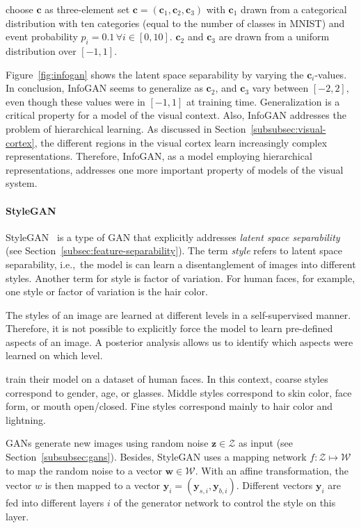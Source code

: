  \citet{chen2016infogan} choose $\bm{c}$ as three-element set $\bm{c} = (\bm{c}_1, \bm{c}_2, \bm{c}_3)$ with $\bm{c}_1$ drawn from a categorical distribution with ten categories (equal to the number of classes in MNIST) and event probability $p_i=0.1 \, \forall i \in [0, 10]$.
$\bm{c}_2$ and $\bm{c}_3$ are drawn from a uniform distribution over $[-1, 1]$.

Figure~\ref{fig:infogan} shows the latent space separability by varying the $\bm{c}_i$-values.
In conclusion, InfoGAN seems to generalize as $\bm{c}_2$, and $\bm{c}_3$ vary between $[-2, 2]$, even though these values were in $[-1, 1]$ at training time.
Generalization is a critical property for a model of the visual context.
Also, InfoGAN addresses the problem of hierarchical learning.
As discussed in Section~\ref{subsubsec:visual-cortex}, the different regions in the visual cortex learn increasingly complex representations.
Therefore, InfoGAN, as a model employing hierarchical representations, addresses one more important property of models of the visual system.

\paragraph{StyleGAN}
StyleGAN~\citep{karras2019style} is a type of \ac{GAN} that explicitly addresses \textit{latent space separability} (see Section~\ref{subsec:feature-separability}).
The term \textit{style} refers to latent space separability, i.e.,~the model is can learn a disentanglement of images into different styles.
Another term for style is factor of variation.
For human faces, for example, one style or factor of variation is the hair color.

The styles of an image are learned at different levels in a self-supervised manner.
Therefore, it is not possible to explicitly force the model to learn pre-defined aspects of an image.
A posterior analysis allows us to identify which aspects were learned on which level.

\citet{karras2019style} train their model on a dataset of human faces.
In this context, coarse styles correspond to gender, age, or glasses.
Middle styles correspond to skin color, face form, or mouth open/closed.
Fine styles correspond mainly to hair color and lightning.

\acp{GAN} generate new images using random noise $\bm{z}\in \mathcal{Z}$ as input (see Section~\ref{subsubsec:gans}).
Besides, StyleGAN uses a mapping network $f: \mathcal{Z}\mapsto \mathcal{W}$ to map the random noise to a vector $\bm{w}\in \mathcal{W}$.
With an affine transformation, the vector $w$ is then mapped to a vector $\bm{y}_i = (\bm{y}_{s,i}, \bm{y}_{b,i})$.
Different vectors $\bm{y}_i$ are fed into different layers $i$ of the generator network to control the style on this layer.

